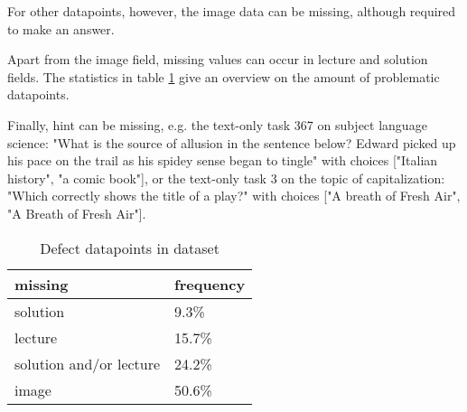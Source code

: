 \documentclass{article}
\begin{document}
For other datapoints, however, the image data can be missing, although required to make an answer.

Apart from the image field, missing values can occur in lecture and solution fields. The statistics in table \ref{table:dataset-stats} give an overview on the amount of problematic datapoints. 

Finally, hint can be missing, e.g. the text-only task 367 on subject language science: "What is the source of allusion in the sentence below? Edward picked up his pace on the trail as his spidey sense began to tingle" with choices ["Italian history", "a comic book"], or the text-only task 3 on the topic of capitalization: "Which correctly shows the title of a play?" with choices ["A breath of Fresh Air", "A Breath of Fresh Air"]. 

\begin{table}[h!]
\centering
\begin{tabular}{ll}\toprule
	missing & frequency \\\midrule
	solution & 9.3\% \\
	lecture & 15.7\% \\
	solution and/or lecture & 24.2\% \\
	image & 50.6\%\\\bottomrule
\end{tabular}
\caption{Defect datapoints in dataset}
\label{table:dataset-stats}
\end{table}
\end{document}
